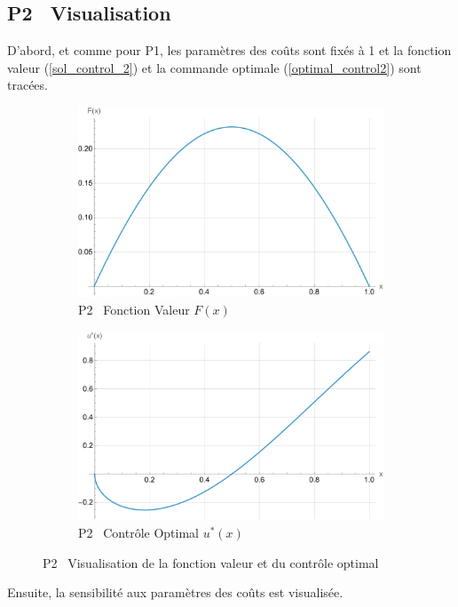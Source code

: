 \subsection{P2 \textemdash~Visualisation}
D'abord, et comme pour P1, les paramètres des coûts sont fixés à 1 et la fonction valeur (\ref{sol_control_2}) et la commande optimale (\ref{optimal_control2}) sont tracées.
\begin{figure}[htb]
    \centering
    \begin{subfigure}{0.49\linewidth}
        \includegraphics[width=\linewidth]{img/validation/P2/p2_value.pdf}
        \caption{P2 \textemdash~Fonction Valeur $F(x)$}\label{fig:ValueVisualisation2}
    \end{subfigure}
    \hfill
    \begin{subfigure}{0.49\linewidth}
        \includegraphics[width=\linewidth]{img/validation/P2/p2_control.pdf}
        \caption{P2 \textemdash~Contrôle Optimal $u^*(x)$}\label{fig:ControlVisualisation2}
    \end{subfigure}
    \caption{P2 \textemdash~Visualisation de la fonction valeur et du contrôle optimal}\label{fig:ValueControlComparison2}
\end{figure}\FloatBarrier Ensuite, la sensibilité aux paramètres des coûts est visualisée.
